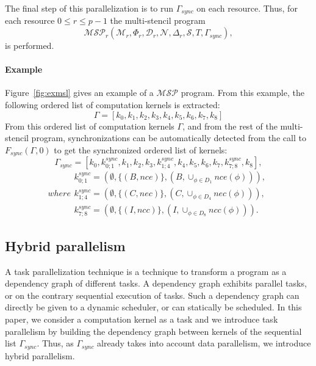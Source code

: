  The final step of this parallelization is to run $\Gamma_{sync}$ on each resource. Thus, for each resource $0 \leq r \leq p-1$ the multi-stencil program 
\begin{equation}
\mathcal{MSP}_r(\mathcal{M}_r,\Phi_r,\mathcal{D}_r,\mathcal{N},\Delta_r,\mathcal{S},T,\Gamma_{sync}),
\end{equation}
is performed.

\paragraph{\textbf{Example}} Figure~\ref{fig:exmsl} gives an example of a $\mathcal{MSP}$ program. From this example, the following ordered list of computation kernels is extracted:
\begin{equation*}
\Gamma = [k_0,k_1,k_2,k_3,k_4,k_5,k_6,k_7,k_8]
\end{equation*}
From this ordered list of computation kernels $\Gamma$, and from the rest of the multi-stencil program, synchronizations can be automatically detected from the call to $F_{sync}(\Gamma,0)$ to get the synchronized ordered list of kernels:
\begin{equation}
\Gamma_{sync} = [k_0,k_{0;1}^{sync},k_1,k_2,k_3,k_{1;4}^{sync},k_4,k_5,k_6,k_7,k_{7;8}^{sync},k_8],
\label{eq:exsync}
\end{equation}
\begin{subequations}
where
\begin{align}
        k_{0;1}^{sync}=(\emptyset,\{(B,nce)\},(B,\cup_{\phi \in D_1} nce(\phi))),\\
        k_{1;4}^{sync}=(\emptyset,\{(C,nec)\},(C,\cup_{\phi \in D_4} nec(\phi))),\\
        k_{7;8}^{sync}=(\emptyset,\{(I,ncc)\},(I,\cup_{\phi \in D_8} ncc(\phi))).
\end{align}
\end{subequations}

\subsection{Hybrid parallelism}
A task parallelization technique is a technique to transform a program as a dependency graph of different tasks. A dependency graph exhibits parallel tasks, or on the contrary sequential execution of tasks. Such a dependency graph can directly be given to a dynamic scheduler, or can statically be scheduled. In this paper, we consider a computation kernel as a task and we introduce task parallelism by building the dependency graph between kernels of the sequential list $\Gamma_{sync}$. Thus, as $\Gamma_{sync}$ already takes into account data parallelism, we introduce hybrid parallelism.

